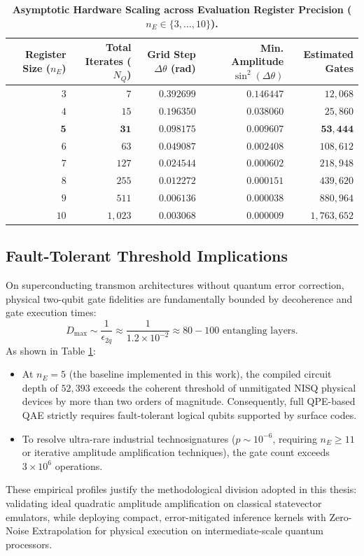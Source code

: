 \begin{table}[htbp]
\centering
\caption{\textbf{Asymptotic Hardware Scaling across Evaluation Register Precision ($n_E \in \{3, \dots, 10\}$).}}
\label{tab:qae_scaling_registers}
\small
\begin{tabular}{rrrrr}
\toprule
\textbf{Register Size ($n_E$)} & \textbf{Total Iterates ($N_Q$)} & \textbf{Grid Step $\Delta\theta$ (rad)} & \textbf{Min. Amplitude $\sin^2(\Delta\theta)$} & \textbf{Estimated Gates} \\
\midrule
$3$ & $7$ & $0.392699$ & $0.146447$ & $12{,}068$ \\
$4$ & $15$ & $0.196350$ & $0.038060$ & $25{,}860$ \\
$\mathbf{5}$ & $\mathbf{31}$ & $\mathbf{0.098175}$ & $\mathbf{0.009607}$ & $\mathbf{53{,}444}$ \\
$6$ & $63$ & $0.049087$ & $0.002408$ & $108{,}612$ \\
$7$ & $127$ & $0.024544$ & $0.000602$ & $218{,}948$ \\
$8$ & $255$ & $0.012272$ & $0.000151$ & $439{,}620$ \\
$9$ & $511$ & $0.006136$ & $0.000038$ & $880{,}964$ \\
$10$ & $1{,}023$ & $0.003068$ & $0.000009$ & $1{,}763{,}652$ \\
\bottomrule
\end{tabular}
\end{table}

\subsection{Fault-Tolerant Threshold Implications}
On superconducting transmon architectures without quantum error correction, physical two-qubit gate fidelities are fundamentally bounded by decoherence and gate execution times:
\begin{equation}
D_{\mathrm{max}} \sim \frac{1}{\epsilon_{2q}} \approx \frac{1}{1.2 \times 10^{-2}} \approx 80 - 100 \text{ entangling layers}.
\end{equation}
As shown in Table \ref{tab:qae_scaling_registers}:
\begin{itemize}[leftmargin=*]
    \item At $n_E = 5$ (the baseline implemented in this work), the compiled circuit depth of $52{,}393$ exceeds the coherent threshold of unmitigated NISQ physical devices by more than two orders of magnitude. Consequently, full QPE-based QAE strictly requires fault-tolerant logical qubits supported by surface codes.
    \item To resolve ultra-rare industrial technosignatures ($p \sim 10^{-6}$, requiring $n_E \ge 11$ or iterative amplitude amplification techniques), the gate count exceeds $3 \times 10^6$ operations.
\end{itemize}
These empirical profiles justify the methodological division adopted in this thesis: validating ideal quadratic amplitude amplification on classical statevector emulators, while deploying compact, error-mitigated inference kernels with Zero-Noise Extrapolation for physical execution on intermediate-scale quantum processors.
